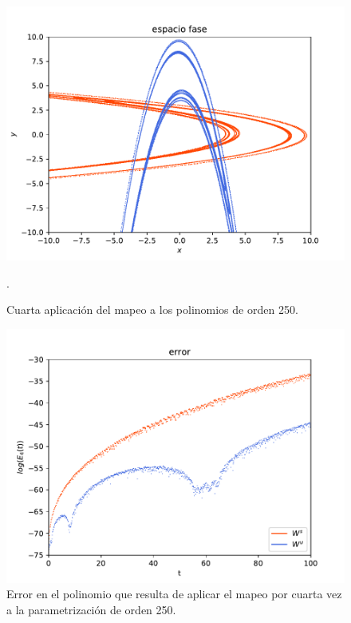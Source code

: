 \begin{figure}[h!]
\centering
\includegraphics[scale=0.7]{rectangulo4.pdf}
\caption{Cuarta aplicación del mapeo a los polinomios de orden 250.}.
\label{Rectangulo4}
\end{figure}

\begin{figure}[h!]
\centering
\includegraphics[scale=0.65]{error4ite.pdf}
\caption{Error en el polinomio que resulta de aplicar el mapeo por cuarta vez a la parametrización de orden 250.}
\label{error-4iteracion}
\end{figure}

